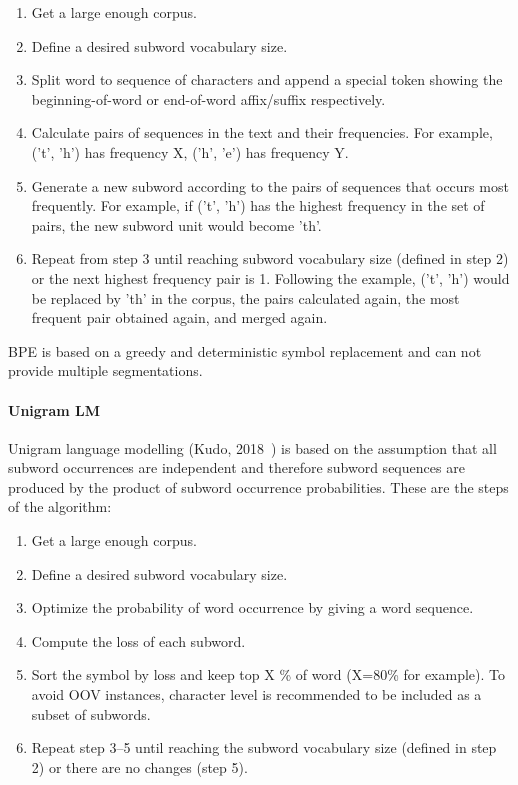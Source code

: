 \begin{enumerate}
    \item Get a large enough corpus.
    \item Define a desired subword vocabulary size.
    \item Split word to sequence of characters and append a special token showing the beginning-of-word or end-of-word affix/suffix respectively.
    \item Calculate pairs of sequences in the text and their frequencies. For example, ('t', 'h') has frequency X, ('h', 'e') has frequency Y.
    \item Generate a new subword according to the pairs of sequences that occurs most frequently. For example, if ('t', 'h') has the highest frequency in the set of pairs, the new subword unit would become 'th'.
    \item Repeat from step 3 until reaching subword vocabulary size (defined in step 2) or the next highest frequency pair is 1. Following the example, ('t', 'h') would be replaced by 'th' in the corpus, the pairs calculated again, the most frequent pair obtained again, and merged again.
\end{enumerate}

BPE is based on a greedy and deterministic symbol replacement and can not provide multiple segmentations.

\paragraph{Unigram LM}\label{subsubsec:unigramlm}

Unigram language modelling (Kudo, 2018~\cite{kudo-2018-subword}) is based on the assumption that all subword occurrences are independent and therefore subword sequences are produced by the product of subword occurrence probabilities. These are the steps of the algorithm:

\begin{enumerate}
    \item Get a large enough corpus.
    \item Define a desired subword vocabulary size.
    \item Optimize the probability of word occurrence by giving a word sequence.
    \item Compute the loss of each subword.
    \item Sort the symbol by loss and keep top X \% of word (X=80\% for example). To avoid OOV instances, character level is recommended to be included as a subset of subwords.
    \item Repeat step 3–5 until reaching the subword vocabulary size (defined in step 2) or there are no changes (step 5).
\end{enumerate}

